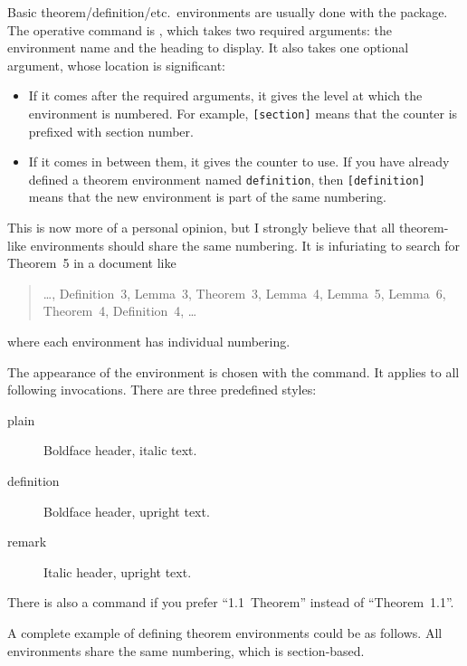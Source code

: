 Basic theorem/definition/etc.\ environments are usually done with the  package.
The operative command is , which takes two required arguments:
the environment name and the heading to display.
It also takes one optional argument, whose location is significant:
\begin{itemize}
\item If it comes after the required arguments,
    it gives the level at which the environment is numbered.
    For example, \verb|[section]| means that the counter is prefixed with section number.
\item If it comes in between them, it gives the counter to use.
    If you have already defined a theorem environment named \verb|definition|,
    then \verb|[definition]| means that the new environment is part of the same numbering.
\end{itemize}

\begin{practices}
This is now more of a personal opinion,
but I strongly believe that all theorem-like environments should share the same numbering.
It is infuriating to search for Theorem~5 in a document like
\begin{quote}
    \dots, Definition~3, Lemma~3, Theorem~3, Lemma~4, Lemma~5, Lemma~6, Theorem~4,
    Definition~4, \dots
\end{quote}
where each environment has individual numbering.
\end{practices}

The appearance of the environment is chosen with the  command.
It applies to all following  invocations.
There are three predefined styles:
\begin{description}
\item[plain] Boldface header, italic text.
\item[definition] Boldface header, upright text.
\item[remark] Italic header, upright text.
\end{description}
%
There is also a  command if you prefer ``1.1~Theorem'' instead of ``Theorem~1.1''.

A complete example of defining theorem environments could be as follows.
All environments share the same numbering, which is section-based.
%
\begin{ExampleCode}
\theoremstyle{plain}
\newtheorem{theorem}{Theorem}[section]
\newtheorem{lemma}[theorem]{Lemma}
\newtheorem{corollary}[theorem]{Corollary}

\theoremstyle{remark}
\newtheorem{remark}[theorem]{Remark}
\newtheorem{example}[theorem]{Example}

\theoremstyle{definition}
\newtheorem{definition}[theorem]{Definition}
\end{ExampleCode}

